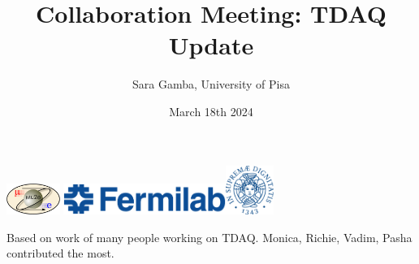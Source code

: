 \documentclass{beamer}[10pt]
\title[TDAQ \& VST]{
  {
    \bf {Collaboration Meeting: TDAQ Update} }
}
\author[Sara Gamba]{
  \fontseries{s}
  \selectfont
  { Sara Gamba, University of Pisa}
}
\date{March 18th 2024}
\begin{document}
% 
% 



\begin{frame}
\centering
\includegraphics[height=1cm]{figures/png/mu2e_logo_oval.png}
\titlepage
\centering
\includegraphics[height=1cm]{figures/png/FNAL-Logo-NAL-Blue.png}\hspace{10mm}\includegraphics[height=1.6cm]{figures/pdf/cherubino.pdf}

\end{frame}
\begin{frame}
Based on work of many people working on TDAQ. Monica, Richie, Vadim, Pasha contributed the most.
\end{frame}
\end{document}
